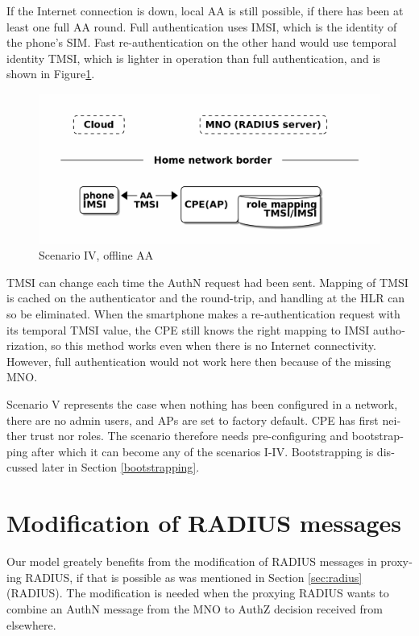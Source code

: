 \documentclass[12pt,a4paper,english]{tutthesis}
\begin{document}
\begin{otherlanguage}{english}
If the Internet connection is down, local AA is still possible, if there
has been at least one full AA round.
Full authentication uses IMSI, which is the identity of the phone's
SIM.  Fast re-authentication on the other hand would 
use temporal identity TMSI, which is lighter in operation than full
authentication, and is shown in Figure\ref{fig:scenario-IV}. 
\begin{figure}[htb]
\centering
\includegraphics[width=.9\linewidth]{scenIV.png}
\caption{\label{fig:scenario-IV}Scenario IV, offline AA}
\end{figure}



TMSI can change each time the AuthN request had been sent. Mapping of
TMSI is cached on the authenticator and the round-trip, and handling at
the HLR can so be eliminated.  When the smartphone makes a
re-authentication request with its temporal TMSI value, the CPE 
still knows the  right mapping to IMSI authorization, so this method works
even when there is no Internet connectivity. However, full authentication
would not work here then because of the missing MNO.








Scenario V represents the case when nothing has been configured in
a network, there are no admin users, and APs are set to factory default.
CPE has first neither trust nor roles. The scenario therefore needs
pre-configuring and bootstrapping after which it can become any of
the scenarios I-IV. Bootstrapping is discussed later in 
Section \ref{bootstrapping}.


\section{Modification of RADIUS messages}
\label{sec-4-3}
\label{sec:radius-macs}

Our model greately benefits   from the modification of RADIUS messages in proxying
RADIUS, if that is possible as was mentioned in Section \ref{sec:radius} (RADIUS).
The modification is needed when the proxying RADIUS wants to combine an AuthN message
from the MNO to AuthZ decision received from elsewhere.





\end{otherlanguage}
\end{document}
